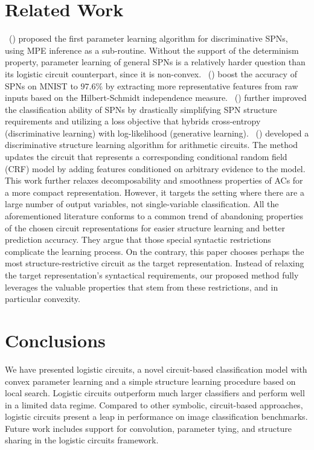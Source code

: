 \documentclass[letterpaper]{article} %
\newcommand{\citet}[1]{\citeauthor{#1}~(\citeyear{#1})}
\begin{document}
\section{Related Work}
\citet{gens2012discriminative} proposed the first parameter learning algorithm for discriminative SPNs, using MPE inference as a sub-routine. Without the support of the determinism property, parameter learning of general SPNs is a relatively harder question than its logistic circuit counterpart, since it is non-convex. \citet{adel2015learning} boost the accuracy of SPNs on MNIST to  $97.6\%$ by extracting more representative features from raw inputs based on the Hilbert-Schmidt independence measure.
\citet{rat-spn2018} further improved the  classification ability of SPNs by drastically simplifying SPN structure requirements and utilizing a loss objective that hybrids cross-entropy (discriminative learning) with log-likelihood (generative learning).  \citet{rooshenas2016discriminative} developed a discriminative structure learning algorithm for arithmetic circuits. The method updates the circuit that represents a corresponding conditional random field (CRF) model by adding features conditioned on arbitrary evidence to the model. This work further relaxes decomposability and smoothness properties of ACs for a more compact representation. However, it targets the setting where there are a large number of output variables, not single-variable classification.  All the aforementioned literature conforms to a common trend of abandoning properties of the chosen circuit representations for easier structure learning and better prediction accuracy. They argue that those special syntactic restrictions complicate the learning process. On the contrary, this paper chooses perhaps the most structure-restrictive circuit as the target representation. Instead of relaxing the target representation's syntactical requirements, our proposed method fully leverages the valuable properties that stem from these restrictions, and in particular convexity.

\vspace{-2.09mm}
\section{Conclusions}

We have presented logistic circuits, a novel circuit-based classification model with convex parameter learning and a simple structure learning procedure based on local search. Logistic circuits outperform much larger classifiers and perform well in a limited data regime. Compared to other symbolic, circuit-based approaches, logistic circuits present a leap in performance on image classification benchmarks.
Future work includes support for convolution, parameter tying, and structure sharing in the logistic circuits framework.
\end{document}
